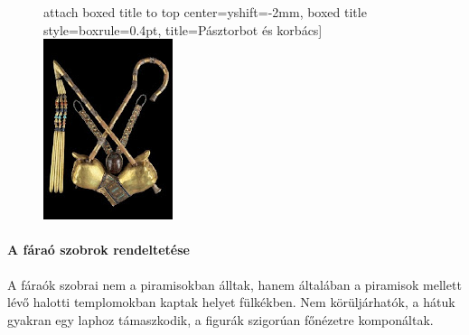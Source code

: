 \begin{figure}[H]
\begin{minipage}{0.44\textwidth}
\begin{tcolorbox}
			attach boxed title to top center={yshift=-2mm},
			boxed title style={boxrule=0.4pt},
			title=Pásztorbot és korbács]{
				\includegraphics[width=1.0\linewidth]{images/01/pasztorbot_korbacs}}
		\end{tcolorbox}
	\end{minipage}
	\captionsetup{labelformat=empty}
	\caption{}
\end{figure}

\paragraph{A fáraó szobrok rendeltetése}
A fáraók szobrai nem a piramisokban álltak, hanem általában a piramisok mellett lévő halotti templomokban kaptak helyet fülkékben. Nem körüljárhatók, a hátuk gyakran egy laphoz támaszkodik, a figurák szigorúan főnézetre komponáltak.

